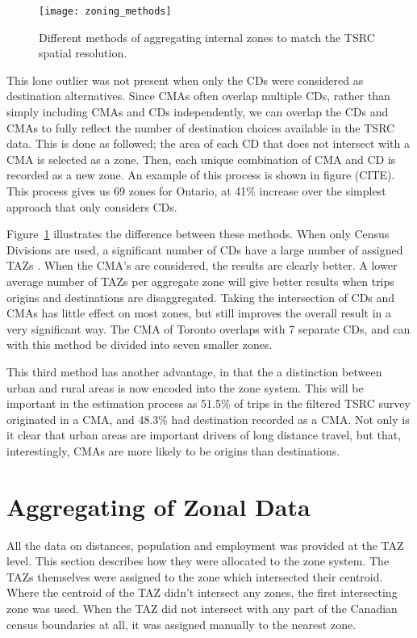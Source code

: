 \begin{figure}[H]
\centering
\texttt{[image: zoning\_methods]}
\caption{Different methods of aggregating internal zones to match the TSRC spatial resolution.}
\label{fig:zoning}
\end{figure}

This lone outlier was not present when only the CDs were considered as destination alternatives. Since CMAs often overlap multiple CDs, rather than simply including CMAs and CDs independently, we can overlap the CDs and CMAs to fully reflect the number of destination choices available in the TSRC data. This is done as followed; the area of each CD that does not intersect with a CMA is selected as a zone. Then, each unique combination of CMA and CD is recorded as a new zone. An example of this process is shown in figure (CITE). This process gives us 69 zones for Ontario, at 41\% increase over the simplest approach that only considers CDs.

Figure~\ref{fig:zoning} illustrates the difference between these methods. When only Census Divisions are used, a significant number of CDs have a large number of assigned TAZs . When the CMA's are considered, the results are clearly better. A lower average number of TAZs per aggregate zone will give better results when trips origins and destinations are disaggregated. Taking the intersection of CDs and CMAs has little effect on most zones, but still improves the overall result in a very significant way. The CMA of Toronto overlaps with 7 separate CDs, and can with this method be divided into seven smaller zones.

This third method has another advantage, in that the a distinction between urban and rural areas is now encoded into the zone system. This will be important in the estimation process as 51.5\% of trips in the filtered TSRC survey originated in a CMA, and 48.3\% had destination recorded as a CMA. Not only is it clear that urban areas are important drivers of long distance travel, but that, interestingly, CMAs are more likely to be origins than destinations.

\section{Aggregating of Zonal Data}
All the data on distances, population and employment was provided at the TAZ level. This section describes how they were allocated to the zone system. The TAZs themselves were assigned to the zone which intersected their centroid. Where the centroid of the TAZ didn't intersect any zones, the first intersecting zone was used. When the TAZ did not intersect with any part of the Canadian census boundaries at all, it was assigned manually to the nearest zone.


